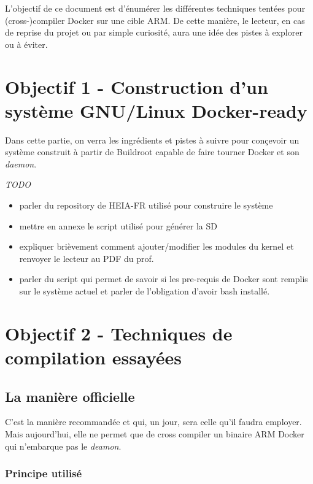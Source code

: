 \documentclass[11pt,a4paper,oneside]{article}
\begin{document}
L'objectif de ce document est d'énumérer les différentes techniques tentées pour (cross-)compiler Docker sur une cible ARM. De cette manière, le lecteur, en cas de reprise du projet ou par simple curiosité, aura une idée des pistes à explorer ou à éviter.



\chapter{Objectif 1 - Construction d'un système GNU/Linux Docker-ready}

Dans cette partie, on verra les ingrédients et pistes à suivre pour conçevoir un système construit à partir de Buildroot capable de faire tourner Docker et son \emph{daemon}.


\emph{TODO}

\begin{itemize}
  \item{parler du repository de HEIA-FR utilisé pour construire le système}
  \item{mettre en annexe le script utilisé pour générer la SD}
  \item{expliquer brièvement comment ajouter/modifier les modules du kernel et  renvoyer le lecteur au PDF du prof.}
    \item{parler du script qui permet de savoir si les pre-requis de Docker sont remplis sur le système actuel et parler de l'obligation d'avoir bash installé.}
\end{itemize}




\chapter{Objectif 2 - Techniques de compilation essayées}

\section{La manière officielle}

C'est la manière recommandée et qui, un jour, sera celle qu'il faudra
employer. Mais aujourd'hui, elle ne permet que de cross compiler un
binaire ARM Docker qui n'embarque pas le \emph{deamon}.

\subsection{Principe utilisé}
\end{document}
